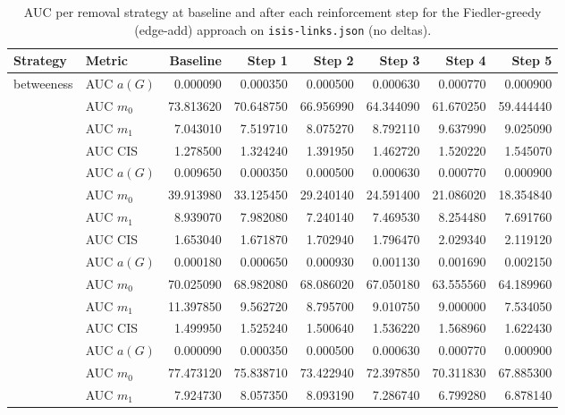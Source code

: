 
\begin{table}[htbp]
  \centering
  \caption{AUC per removal strategy at baseline and after each reinforcement step for the Fiedler-greedy (edge-add) approach on \texttt{isis-links.json} (no deltas).}
  \label{tab:isis-links-fiedler_greedy-auc}
  \begin{tabular}{llrrrrrr}
    \toprule
    \textbf{Strategy} & \textbf{Metric} & \textbf{Baseline} & \textbf{Step 1} & \textbf{Step 2} & \textbf{Step 3} & \textbf{Step 4} & \textbf{Step 5} \\
    \midrule
    \multirow{4}{*}{betweeness} & AUC $a(G)$ & 0.000090 & 0.000350 & 0.000500 & 0.000630 & 0.000770 & 0.000900 \\
    & AUC $m_0$ & 73.813620 & 70.648750 & 66.956990 & 64.344090 & 61.670250 & 59.444440 \\
    & AUC $m_1$ & 7.043010 & 7.519710 & 8.075270 & 8.792110 & 9.637990 & 9.025090 \\
    & AUC CIS & 1.278500 & 1.324240 & 1.391950 & 1.462720 & 1.520220 & 1.545070 \\
    \addlinespace
    \multirow{4}{*}{closeness} & AUC $a(G)$ & 0.009650 & 0.000350 & 0.000500 & 0.000630 & 0.000770 & 0.000900 \\
    & AUC $m_0$ & 39.913980 & 33.125450 & 29.240140 & 24.591400 & 21.086020 & 18.354840 \\
    & AUC $m_1$ & 8.939070 & 7.982080 & 7.240140 & 7.469530 & 8.254480 & 7.691760 \\
    & AUC CIS & 1.653040 & 1.671870 & 1.702940 & 1.796470 & 2.029340 & 2.119120 \\
    \addlinespace
    \multirow{4}{*}{core influence} & AUC $a(G)$ & 0.000180 & 0.000650 & 0.000930 & 0.001130 & 0.001690 & 0.002150 \\
    & AUC $m_0$ & 70.025090 & 68.982080 & 68.086020 & 67.050180 & 63.555560 & 64.189960 \\
    & AUC $m_1$ & 11.397850 & 9.562720 & 8.795700 & 9.010750 & 9.000000 & 7.534050 \\
    & AUC CIS & 1.499950 & 1.525240 & 1.500640 & 1.536220 & 1.568960 & 1.622430 \\
    \addlinespace
    \multirow{4}{*}{degree} & AUC $a(G)$ & 0.000090 & 0.000350 & 0.000500 & 0.000630 & 0.000770 & 0.000900 \\
    & AUC $m_0$ & 77.473120 & 75.838710 & 73.422940 & 72.397850 & 70.311830 & 67.885300 \\
    & AUC $m_1$ & 7.924730 & 8.057350 & 8.093190 & 7.286740 & 6.799280 & 6.878140 \\

\end{tabular}
\end{table}
